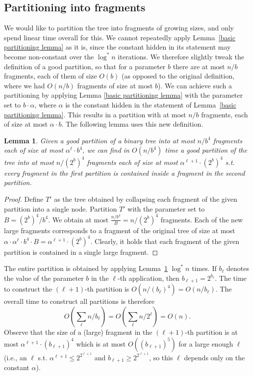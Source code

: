 \documentclass[11pt,a4paper]{article}
\newtheorem{lemma}{Lemma}
\theoremstyle{definition}
\theoremstyle{remark}
\begin{document}
\subsection{Partitioning into fragments}\label{section:partioioning}
We would like to partition the tree into fragments of growing sizes, and only spend linear time overall for this. We cannot repeatedly apply Lemma~\ref{basic partitioning lemma} as it is, since the constant hidden in its statement may become non-constant over the $\log^*n$ iterations. We therefore slightly tweak the definition of a good partition, so that for a parameter $b$ there are at most $n/b$ fragments, each of them of size $O(b)$ (as opposed to the original definition, where we had $O(n/b)$ fragments of size at most $b$). We can achieve such a partitioning by applying Lemma \ref{basic partitioning lemma} with the parameter set to $b \cdot \alpha$, where $\alpha$ is the constant hidden in the statement of Lemma~\ref{basic partitioning lemma}. This results in a partition with at most $n/b$ fragments, each of size at most $\alpha \cdot b$. The following lemma uses this new definition.

\begin{lemma}\label{good partition refinement lemma}
Given a good partition of a binary tree into at most $n/b^{4}$ fragments each of size at most $\alpha^{\ell}\cdot b^{4}$, 
we can find in $O(n/b^{4})$ time
a good partition of the tree into at most $n/(2^b)^{4}$ fragments each of size at most $\alpha^{\ell+1}\cdot (2^{b})^{4}$
s.t. every fragment in the first partition is contained inside a fragment in the second partition.
\end{lemma}
\begin{proof}
Define $T'$ as the tree obtained by collapsing each fragment of the given partition into a single node. Partition $T'$ with the parameter set to $B= {(2^{b})^{4}}/{b^{4}}$. We obtain at most $\frac{n/b^4}{B}=n/(2^{b})^{4}$ fragments. Each of the new large fragments corresponds to a fragment of the original tree of size at most $\alpha\cdot \alpha^{\ell}\cdot b^{4}\cdot B = \alpha^{\ell+1}\cdot (2^{b})^{4}$. Clearly, it holds that each fragment of the given partition is contained in a single large fragment.
\end{proof}

\noindent The entire partition is obtained by applying Lemma~\ref{good partition refinement lemma} $\log^{*}n$ times. 
If $b_{\ell}$ denotes the value of the parameter $b$ in the $\ell$-th application, then  $b_{\ell+1}=2^{b_{\ell}}$. The time to construct the $(\ell+1)$-th partition is $O(n/(b_{\ell})^{4})=O(n/b_{\ell})$. The overall time to construct all partitions is therefore 
$$ O(\sum_{\ell} {n}/{b_{\ell}}) = O(\sum_{\ell} {n}/{2^{\ell}}) = O(n).$$
Observe that the size of a (large) fragment in the $(\ell+1)$-th partition is at most $\alpha^{\ell+1} \cdot (b_{\ell+1})^{4}$ which is at most $O((b_{\ell+1})^5)$ for a large enough $\ell$ (i.e., an $\ell$ s.t. $\alpha^{\ell+1}\leq 2^{2^{\ell+1}}$ and $b_{\ell+1}\geq 2^{2^{\ell+1}}$, so
this $\ell$ depends only on the constant $\alpha$).
\end{document}
